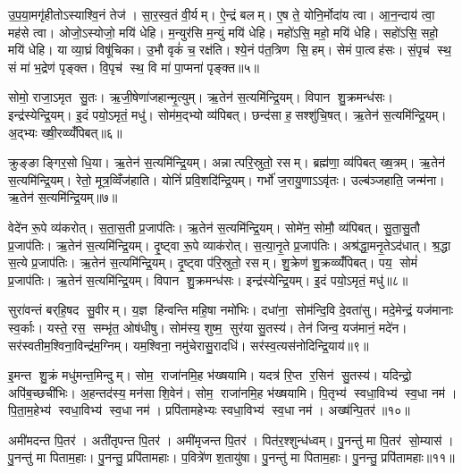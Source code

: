 उ॒प॒या॒मगृ॑हीतोऽस्याश्वि॒नं तेज॑। सा॒र॒स्व॒तं वी॒र्यम्। ऐ॒न्द्रं बलम्। ए॒ष ते॒ योनि॒र्मोदा॑य त्वा। आ॒न॒न्दाय॑ त्वा॒ मह॑से त्वा। ओजो॒ऽस्योजो॒ मयि॑ धेहि। म॒न्युर॑सि म॒न्युं मयि॑ धेहि। महो॑ऽसि॒ महो॒ मयि॑ धेहि। सहो॑ऽसि॒ सहो॒ मयि॑ धेहि। या व्या॒घ्रं विषू॑चिका। उ॒भौ वृकं॑ च॒ रक्ष॑ति। श्ये॒नं प॑त॒त्रिण सि॒हम्। सेमं पा॒त्वह॑सः। सं॒पृच॑ स्थ॒ सं मा॑ भ॒द्रेण॑ पृङ्क्त। वि॒पृच॑ स्थ॒ वि मा॑ पा॒प्मना॑ पृङ्क्त॥५॥\anuvakamend[ह॒विः प्र॒त्यङ्ख्सोमो॒ अति॑द्रुतो गृह्णाम्यावि॒शन्विषू॑चिका॒ पञ्च॑ च]

सोमो॒ राजा॒ऽमृत सु॒तः। ऋ॒जी॒षेणा॑जहान्मृ॒त्युम्। ऋ॒तेन॑ स॒त्यमि॑न्द्रि॒यम्। विपान शु॒क्रमन्ध॑सः। इन्द्र॑स्येन्द्रि॒यम्। इ॒दं पयो॒ऽमृतं॒ मधु॑। सोम॑म॒द्भ्यो व्य॑पिबत्। छन्द॑सा ह॒सश्शु॑चि॒षत्। ऋ॒तेन॑ स॒त्यमि॑न्द्रि॒यम्। अ॒द्भ्यः ख्षी॒रव्व्यँ॑पिबत्॥६॥

क्रुङ्ङाङ्गिर॒सो धि॒या। ऋ॒तेन॑ स॒त्यमि॑न्द्रि॒यम्। अन्नात्परि॒स्रुतो॒ रसम्। ब्रह्म॑णा॒ व्य॑पिबत् ख्ष॒त्रम्। ऋ॒तेन॑ स॒त्यमि॑न्द्रि॒यम्। रेतो॒ मूत्र॒व्विँज॑हाति। योनिं॑ प्रवि॒शदि॑न्द्रि॒यम्। गर्भो॑ ज॒रायु॒णाऽऽवृ॑तः। उल्ब॑ञ्जहाति॒ जन्म॑ना। ऋ॒तेन॑ स॒त्यमि॑न्द्रि॒यम्॥७॥

वेदे॑न रू॒पे व्य॑करोत्। स॒ता॒स॒ती प्र॒जाप॑तिः। ऋ॒तेन॑ स॒त्यमि॑न्द्रि॒यम्। सोमे॑न॒ सोमौ॒ व्य॑पिबत्। सु॒ता॒सु॒तौ प्र॒जाप॑तिः। ऋ॒तेन॑ स॒त्यमि॑न्द्रि॒यम्। दृ॒ष्ट्वा रू॒पे व्याक॑रोत्। स॒त्या॒नृ॒ते प्र॒जाप॑तिः। अश्र॑द्धा॒मनृ॒तेऽद॑धात्। श्र॒द्धा स॒त्ये प्र॒जाप॑तिः। ऋ॒तेन॑ स॒त्यमि॑न्द्रि॒यम्। दृ॒ष्ट्वा प॑रि॒स्रुतो॒ रसम्। शु॒क्रेण॑ शु॒क्रव्व्यँ॑पिबत्। पय॒ सोमं॑ प्र॒जाप॑तिः। ऋ॒तेन॑ स॒त्यमि॑न्द्रि॒यम्। विपान शु॒क्रमन्ध॑सः। इन्द्र॑स्येन्द्रि॒यम्। इ॒दं पयो॒ऽमृतं॒ मधु॑॥८॥\anuvakamend[अ॒द्भ्यः ख्षी॒रव्व्यँ॑पिब॒ज्जन्म॑न॒र्तेन॑ स॒त्यमि॑न्द्रि॒य श्र॒द्धा स॒त्ये प्र॒जाप॑तिर॒ष्टौ च॑]

सुरा॑वन्तं बर्‌हि॒षद सु॒वीरम्। य॒ज्ञ हि॑न्वन्ति महि॒षा नमो॑भिः। दधा॑ना॒ सोम॑न्दि॒वि दे॒वता॑सु। मदे॒मेन्द्रं॒ यज॑मानाः स्व॒र्काः। यस्ते॒ रस॒ सम्भृ॑त॒ ओष॑धीषु। सोम॑स्य॒ शुष्म॒ सुर॑या सु॒तस्य॑। तेन॑ जिन्व॒ यज॑मानं॒ मदे॑न। सर॑स्वतीम॒श्विना॒विन्द्र॑म॒ग्निम्। यम॒श्विना॒ नमु॑चेरासु॒रादधि॑। सर॑स्व॒त्यस॑नोदिन्द्रि॒याय॑॥९॥

इ॒मन्त शु॒क्रं मधु॑मन्त॒मिन्दुम्। सोम॒ राजा॑नमि॒ह भ॑ख्षयामि। यदत्र॑ रि॒प्त र॒सिन॑ सु॒तस्य॑। यदिन्द्रो॒ अपि॑ब॒च्छची॑भिः। अ॒हन्तद॑स्य॒ मन॑सा शि॒वेन॑। सोम॒ राजा॑नमि॒ह भ॑ख्षयामि। पि॒तृभ्य॑ स्वधा॒विभ्य॑ स्व॒धा नम॑। पि॒ता॒म॒हेभ्य॑ स्वधा॒विभ्य॑ स्व॒धा नम॑। प्रपि॑तामहेभ्यः स्वधा॒विभ्य॑ स्व॒धा नम॑। अख्ष॑न्पि॒तर॑॥१०॥

अमी॑मदन्त पि॒तर॑। अती॑तृपन्त पि॒तर॑। अमी॑मृजन्त पि॒तर॑। पित॑र॒श्शुन्ध॑ध्वम्। पु॒नन्तु॑ मा पि॒तर॑ सो॒म्यास॑। पु॒नन्तु॑ मा पिताम॒हाः। पु॒नन्तु॒ प्रपि॑तामहाः। प॒वित्रे॑ण श॒तायु॑षा। पु॒नन्तु॑ मा पिताम॒हाः। पु॒नन्तु॒ प्रपि॑तामहाः॥११॥

